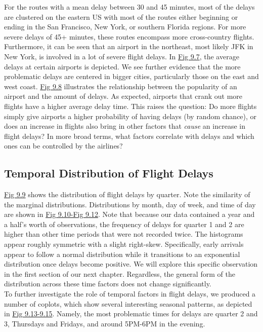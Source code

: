 \documentclass[12pt, a4paper, openany]{book}
\newcommand\tab[1][1cm]{\hspace*{#1}}
\begin{document}
	 		\tab For the routes with a mean delay between 30 and 45 minutes, most of the delays are clustered on the eastern US with most of the routes either beginning or ending in the San Francisco, New York, or southern Florida regions. For more severe delays of 45+ minutes, these routes encompass more cross-country flights. Furthermore, it can be seen that an airport in the northeast, most likely JFK in New York, is involved in a lot of severe flight delays. In \underline{Fig 9.7}, the average delays at certain airports is depicted. We see further evidence that the more problematic delays are centered in bigger cities, particularly those on the east and west coast. \underline{Fig 9.8} illustrates the relationship between the popularity of an airport and the amount of delays. As expected, airports that crank out more flights have a higher average delay time. This raises the question: Do more flights simply give airports a higher probability of having delays (by random chance), or does an increase in flights also bring in other factors that \textit{cause} an increase in flight delays? In more broad terms, what factors correlate with delays and which ones can be controlled by the airlines?\\
		\subsection{Temporal Distribution of Flight Delays}

			\tab \underline{Fig 9.9} shows the distribution of flight delays by quarter. Note the similarity of the marginal distributions. Distributions by month, day of week, and time of day are shown in \underline{Fig 9.10-Fig 9.12}. Note that because our data contained a year and a half’s worth of observations, the frequency of delays for quarter 1 and 2 are higher than other time periods that were not recorded twice. The histograms appear roughly symmetric with a slight right-skew. Specifically, early arrivals appear to follow a normal distribution while it transitions to an exponential distribution once delays become positive. We will explore this specific observation in the first section of our next chapter. Regardless, the general form of the distribution across these time factors does not change significantly. \\
	
	
		
	\tab To further investigate the role of temporal factors in flight delays, we produced a number of coplots, which show several interesting seasonal patterns, as depicted in \underline{Fig 9.13-9.15}. Namely, the most problematic times for delays are quarter 2 and 3, Thursdays and Fridays, and around 5PM-6PM in the evening.\\	 
\end{document}
